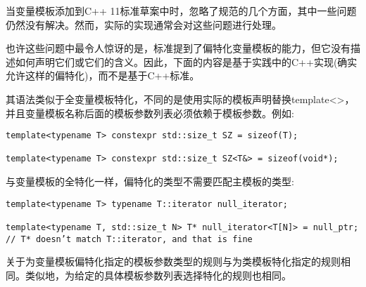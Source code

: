当变量模板添加到C++ 11标准草案中时，忽略了规范的几个方面，其中一些问题仍然没有解决。然而，实际的实现通常会对这些问题进行处理。

也许这些问题中最令人惊讶的是，标准提到了偏特化变量模板的能力，但它没有描述如何声明它们或它们的含义。因此，下面的内容是基于实践中的C++实现(确实允许这样的偏特化)，而不是基于C++标准。

其语法类似于全变量模板特化，不同的是使用实际的模板声明替换template<>，并且变量模板名称后面的模板参数列表必须依赖于模板参数。例如:

\begin{lstlisting}[style=styleCXX]
template<typename T> constexpr std::size_t SZ = sizeof(T);

template<typename T> constexpr std::size_t SZ<T&> = sizeof(void*);
\end{lstlisting}

与变量模板的全特化一样，偏特化的类型不需要匹配主模板的类型:

\begin{lstlisting}[style=styleCXX]
template<typename T> typename T::iterator null_iterator;

template<typename T, std::size_t N> T* null_iterator<T[N]> = null_ptr;
// T* doesn’t match T::iterator, and that is fine
\end{lstlisting}

关于为变量模板偏特化指定的模板参数类型的规则与为类模板特化指定的规则相同。类似地，为给定的具体模板参数列表选择特化的规则也相同。




































